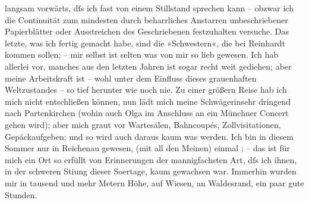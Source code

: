                langsam vorwärts, dſs ich fast von einem Stillstand sprechen kann – obzwar ich die
               Continuität zum mindesten durch beharrliches Anstarren unbeschriebener Papierblätter
               oder Ausstreichen des Geschriebenen festzuhalten versuche. Das letzte, was ich fertig
               gemacht \introOben{}habe\introOben{}, sind die »Schwestern«, die bei Reinhardt kommen
               sollen; – mir selbst ist selten was von mir so lieb gewesen. Ich hab allerlei vor,
               manches aus den letzten Jahren ist sogar recht weit gediehen; aber meine Arbeitskraft
               ist – wohl unter dem Einfluss dieses grauenhaften Weltzustandes – so tief herunter
               wie noch nie. Zu einer größern Reise hab ich mich nicht entschließen können, nun lädt
               mich meine Schwägerinsehr dringend nach Partenkirchen (wohin auch Olga im
               Anschluss an ein Münchner Concert\strikeout{)} gehen wird); aber mich graut vor Wartesälen,
               Bahncoupés, Zollvisitationen, Gepäckaufgeben; und so wird auch daraus kaum was
               werden. Ich bin in diesem Sommer {\pb}nur in Reichenau gewesen, \label{K_L02327-3v}\label{K_L02327-3} (mit all den Meinen) einmal \label{K_L02327-4v}\label{K_L02327-4}; – das ist für mich ein Ort so erfüllt von Erinnerungen der mannigfachsten
               Art, dſs ich ihnen, in der schweren Sti{\geminationm}ung dieser So{\geminationm}ertage, kaum gewachsen war. Immerhin wurden mir in
               tausend und mehr Metern Höhe, auf Wiesen, an Waldesrand, ein paar gute Stunden.\pend
           
